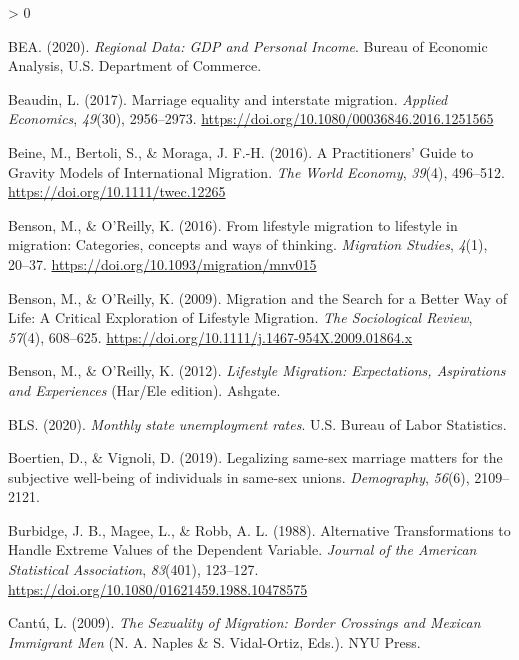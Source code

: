 \documentclass[
  11pt,
]{article}
\newlength{\cslhangindent}
\newenvironment{CSLReferences}[2] %
 {%
  \setlength{\parindent}{0pt}
  \ifodd #1 \everypar{\setlength{\hangindent}{\cslhangindent}}\ignorespaces\fi
  \ifnum #2 > 0
  \setlength{\parskip}{#2\baselineskip}
  \fi
 }%
 {}
\begin{document}
\begin{CSLReferences}{1}{0}
\leavevmode\hypertarget{ref-bea_2020}{}%
BEA. (2020). \emph{Regional {Data}: {GDP} and {Personal Income}}. {Bureau of Economic Analysis, U.S. Department of Commerce}.

\leavevmode\hypertarget{ref-beaudin_2017}{}%
Beaudin, L. (2017). Marriage equality and interstate migration. \emph{Applied Economics}, \emph{49}(30), 2956--2973. \url{https://doi.org/10.1080/00036846.2016.1251565}

\leavevmode\hypertarget{ref-beine_2016}{}%
Beine, M., Bertoli, S., \& Moraga, J. F.-H. (2016). A {Practitioners}' {Guide} to {Gravity Models} of {International Migration}. \emph{The World Economy}, \emph{39}(4), 496--512. \url{https://doi.org/10.1111/twec.12265}

\leavevmode\hypertarget{ref-benson_2016}{}%
Benson, M., \& O'Reilly, K. (2016). From lifestyle migration to lifestyle in migration: {Categories}, concepts and ways of thinking. \emph{Migration Studies}, \emph{4}(1), 20--37. \url{https://doi.org/10.1093/migration/mnv015}

\leavevmode\hypertarget{ref-benson_2009}{}%
Benson, M., \& O'Reilly, K. (2009). Migration and the {Search} for a {Better Way} of {Life}: {A Critical Exploration} of {Lifestyle Migration}. \emph{The Sociological Review}, \emph{57}(4), 608--625. \url{https://doi.org/10.1111/j.1467-954X.2009.01864.x}

\leavevmode\hypertarget{ref-benson_2012}{}%
Benson, M., \& O'Reilly, K. (2012). \emph{Lifestyle {Migration}: {Expectations}, {Aspirations} and {Experiences}} (Har/Ele edition). {Ashgate}.

\leavevmode\hypertarget{ref-bls_2020}{}%
BLS. (2020). \emph{Monthly state unemployment rates}. {U.S. Bureau of Labor Statistics}.

\leavevmode\hypertarget{ref-boertien_2019}{}%
Boertien, D., \& Vignoli, D. (2019). Legalizing same-sex marriage matters for the subjective well-being of individuals in same-sex unions. \emph{Demography}, \emph{56}(6), 2109--2121.

\leavevmode\hypertarget{ref-burbidge_1988_alternative}{}%
Burbidge, J. B., Magee, L., \& Robb, A. L. (1988). Alternative {Transformations} to {Handle Extreme Values} of the {Dependent Variable}. \emph{Journal of the American Statistical Association}, \emph{83}(401), 123--127. \url{https://doi.org/10.1080/01621459.1988.10478575}

\leavevmode\hypertarget{ref-cantu_2009}{}%
Cantú, L. (2009). \emph{The {Sexuality} of {Migration}: {Border Crossings} and {Mexican Immigrant Men}} (N. A. Naples \& S. Vidal-Ortiz, Eds.). {NYU Press}.


\end{CSLReferences}
\end{document}
